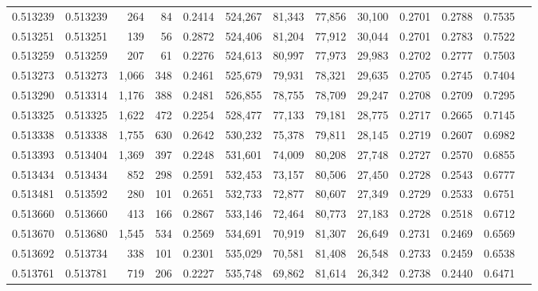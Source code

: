 \begin{tabular}{rrrrrrrrrrrrr}
0.513239 & 0.513239 &   264 &    84 &                                     0.2414 & 524,267 &  81,343 &  77,856 &  30,100 & 0.2701 & 0.2788 & 0.7535 \\
0.513251 & 0.513251 &   139 &    56 &                                     0.2872 & 524,406 &  81,204 &  77,912 &  30,044 & 0.2701 & 0.2783 & 0.7522 \\
0.513259 & 0.513259 &   207 &    61 &                                     0.2276 & 524,613 &  80,997 &  77,973 &  29,983 & 0.2702 & 0.2777 & 0.7503 \\
0.513273 & 0.513273 & 1,066 &   348 &                                     0.2461 & 525,679 &  79,931 &  78,321 &  29,635 & 0.2705 & 0.2745 & 0.7404 \\
0.513290 & 0.513314 & 1,176 &   388 &                                     0.2481 & 526,855 &  78,755 &  78,709 &  29,247 & 0.2708 & 0.2709 & 0.7295 \\
0.513325 & 0.513325 & 1,622 &   472 &                                     0.2254 & 528,477 &  77,133 &  79,181 &  28,775 & 0.2717 & 0.2665 & 0.7145 \\
0.513338 & 0.513338 & 1,755 &   630 &                                     0.2642 & 530,232 &  75,378 &  79,811 &  28,145 & 0.2719 & 0.2607 & 0.6982 \\
0.513393 & 0.513404 & 1,369 &   397 &                                     0.2248 & 531,601 &  74,009 &  80,208 &  27,748 & 0.2727 & 0.2570 & 0.6855 \\
0.513434 & 0.513434 &   852 &   298 &                                     0.2591 & 532,453 &  73,157 &  80,506 &  27,450 & 0.2728 & 0.2543 & 0.6777 \\
0.513481 & 0.513592 &   280 &   101 &                                     0.2651 & 532,733 &  72,877 &  80,607 &  27,349 & 0.2729 & 0.2533 & 0.6751 \\
0.513660 & 0.513660 &   413 &   166 &                                     0.2867 & 533,146 &  72,464 &  80,773 &  27,183 & 0.2728 & 0.2518 & 0.6712 \\
0.513670 & 0.513680 & 1,545 &   534 &                                     0.2569 & 534,691 &  70,919 &  81,307 &  26,649 & 0.2731 & 0.2469 & 0.6569 \\
0.513692 & 0.513734 &   338 &   101 &                                     0.2301 & 535,029 &  70,581 &  81,408 &  26,548 & 0.2733 & 0.2459 & 0.6538 \\
0.513761 & 0.513781 &   719 &   206 &                                     0.2227 & 535,748 &  69,862 &  81,614 &  26,342 & 0.2738 & 0.2440 & 0.6471 \\

\end{tabular}
